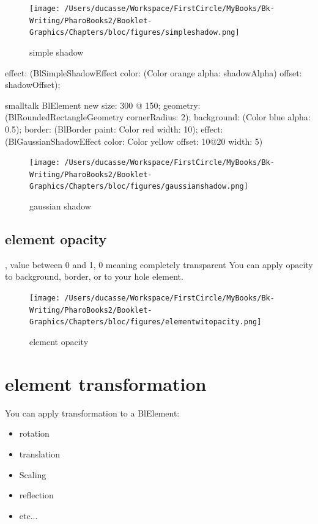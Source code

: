 \documentclass[10pt,twoside,english]{_support/latex/sbabook/sbabook}
\begin{document}
\begin{figure}[htpb]
\begin{center}
\texttt{[image: /Users/ducasse/Workspace/FirstCircle/MyBooks/Bk-Writing/PharoBooks2/Booklet-Graphics/Chapters/bloc/figures/simpleshadow.png]}
\caption{simple shadow}
\end{center}
\end{figure}


effect: (BlSimpleShadowEffect
color: (Color orange alpha: shadowAlpha)
offset: shadowOffset);
\begin{displaycode}{smalltalk}
BlElement new
        size: 300 @ 150;
        geometry: (BlRoundedRectangleGeometry cornerRadius: 2);
        background: (Color blue alpha: 0.5);
        border: (BlBorder paint: Color red width: 10);
        effect: (BlGaussianShadowEffect color: Color yellow offset: 10@20 width: 5)
\end{displaycode}

\begin{figure}[htpb]
\begin{center}
\texttt{[image: /Users/ducasse/Workspace/FirstCircle/MyBooks/Bk-Writing/PharoBooks2/Booklet-Graphics/Chapters/bloc/figures/gaussianshadow.png]}
\caption{gaussian shadow}
\end{center}
\end{figure}


\section{element opacity}
, value between 0 and 1, 0 meaning completely transparent
You can apply opacity to background, border, or to your hole element.

\begin{figure}[htpb]
\begin{center}
\texttt{[image: /Users/ducasse/Workspace/FirstCircle/MyBooks/Bk-Writing/PharoBooks2/Booklet-Graphics/Chapters/bloc/figures/elementwitopacity.png]}
\caption{element opacity}
\end{center}
\end{figure}


\chapter{element transformation}
You can apply transformation to a BlElement:

\begin{itemize}
    \item rotation
    \item translation
    \item Scaling
    \item reflection
    \item etc...
\end{itemize}
\end{document}
